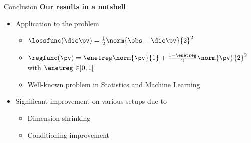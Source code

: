 \begin{frame}{Conclusion}
  \textbf{Our results in a nutshell}
  \begin{itemize}
    \item Application to the  problem 
    \pause
    \begin{itemize}
      \item $\lossfunc(\dic\pv) = \tfrac{1}{2}\norm{\obs-\dic\pv}{2}^2$
      \pause
      \item $\regfunc(\pv) = \enetreg\norm{\pv}{1} + \tfrac{1-\enetreg}{2}\norm{\pv}{2}^2$ with $\enetreg \in ]0,1[$
      \pause
      \item Well-known problem in Statistics and Machine Learning
    \end{itemize}
    \pause
    \item Significant improvement on various setups due to
    \begin{itemize}
      \item Dimension shrinking
      \pause
      \item Conditioning improvement
    \end{itemize}
  \end{itemize}
\end{frame}